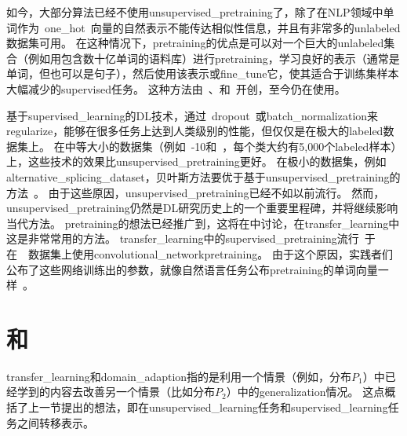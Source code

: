 
如今，大部分算法已经不使用\gls{unsupervised_pretraining}了，除了在\gls{NLP}领域中单词作为~\gls{one_hot}~向量的自然表示不能传达相似性信息，并且有非常多的\gls{unlabeled}数据集可用。
在这种情况下，\gls{pretraining}的优点是可以对一个巨大的\gls{unlabeled}集合（例如用包含数十亿单词的语料库）进行\gls{pretraining}，学习良好的表示（通常是单词，但也可以是句子），然后使用该表示或\gls{fine_tune}它，使其适合于训练集样本大幅减少的\gls{supervised}任务。
这种方法由~\cite{CollobertR2008-small}、\cite{Turian+Ratinov+Bengio-2010-small}和~\cite{collobert2011natural}开创，至今仍在使用。



基于\gls{supervised_learning}的\gls{DL}技术，通过~\gls{dropout}~或\gls{batch_normalization}来\gls{regularize}，能够在很多任务上达到人类级别的性能，但仅仅是在极大的\gls{labeled}数据集上。
在中等大小的数据集（例如~-10和~，每个类大约有5,000个\gls{labeled}样本）上，这些技术的效果比\gls{unsupervised_pretraining}更好。
在极小的数据集，例如\gls{alternative_splicing_dataset}，贝叶斯方法要优于基于\gls{unsupervised_pretraining}的方法~\citep{Srivastava-master-small}。
由于这些原因，\gls{unsupervised_pretraining}已经不如以前流行。
然而，\gls{unsupervised_pretraining}仍然是\gls{DL}研究历史上的一个重要里程碑，并将继续影响当代方法。
\gls{pretraining}的想法已经推广到，这将在中讨论，在\gls{transfer_learning}中这是非常常用的方法。
\gls{transfer_learning}中的\gls{supervised_pretraining}流行~\citep{Oquab-et-al-CVPR2014,yosinski-nips2014}于在~~数据集上使用\gls{convolutional_network}\gls{pretraining}。
由于这个原因，实践者们公布了这些网络训练出的参数，就像自然语言任务公布\gls{pretraining}的单词向量一样~\citep{collobert2011natural,Mikolov-et-al-ICLR2013}。


\section{和}
\label{sec:transfer_learning_and_domain_adaptation}
\gls{transfer_learning}和\gls{domain_adaption}指的是利用一个情景（例如，分布$P_1$）中已经学到的内容去改善另一个情景（比如分布$P_2$）中的\gls{generalization}情况。
这点概括了上一节提出的想法，即在\gls{unsupervised_learning}任务和\gls{supervised_learning}任务之间转移表示。


